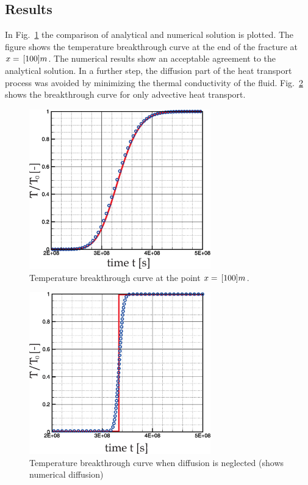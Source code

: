 \subsection{Results}

In Fig.~\ref{fig-addiff-re1} the comparison of analytical and numerical solution is plotted. The figure shows the temperature breakthrough curve at the end of the fracture at $x=\, \mathrm{[}100]{m}$. The numerical results show an acceptable agreement to the analytical solution. In a further step, the diffusion part of the heat transport process was avoided by minimizing the thermal conductivity of the fluid. Fig.~\ref{fig-addiff-re2} shows the breakthrough curve for only advective heat transport.

\begin{figure}[htbp!]
\centering
\includegraphics[width=0.7\textwidth]{PART_II/T/Ad-Diff.eps}
\caption{\label{fig-addiff-re1}Temperature breakthrough curve at the point $x=\, \mathrm{[}100]{m}$.}
\end{figure}

\begin{figure}[htbp!]
\centering
\includegraphics[width=0.7\textwidth]{PART_II/T/advection.eps}
\caption{\label{fig-addiff-re2}Temperature breakthrough curve when diffusion is neglected (shows numerical diffusion)}
\end{figure}
